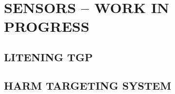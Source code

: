 \chapter{SENSORS -- WORK IN PROGRESS}
\minitoc
\cleardoublepage

\section{LITENING TGP}

\clearpage 

\section{HARM TARGETING SYSTEM}

\cleardoublepage